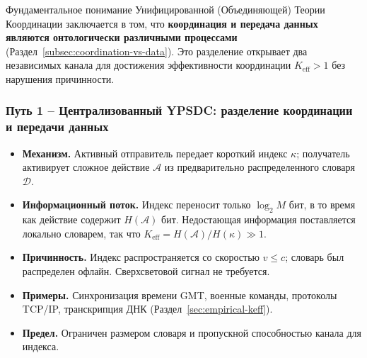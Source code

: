 \documentclass[11pt,a4paper]{article}
\begin{document}
	Фундаментальное понимание Унифицированной (Объединяющей) Теории Координации заключается в том, что
	\textbf{координация и передача данных являются онтологически различными процессами}
	(Раздел~\ref{subsec:coordination-vs-data}). Это разделение открывает два
	независимых канала для достижения эффективности координации
	\(K_{\mathrm{eff}} > 1\) без нарушения причинности.
	
	\subsubsection*{Путь 1 – Централизованный YPSDC: разделение координации и передачи данных}
	\begin{itemize}[leftmargin=*]
		\item \textbf{Механизм.} Активный отправитель передает короткий индекс \(\kappa\);
		получатель активирует сложное действие \(\mathcal{A}\) из предварительно распределенного
		словаря \(\mathcal{D}\).
		\item \textbf{Информационный поток.} Индекс переносит только \(\log_2 M\) бит,
		в то время как действие содержит \(H(\mathcal{A})\) бит. Недостающая информация
		поставляется локально словарем, так что
		\(K_{\mathrm{eff}} = H(\mathcal{A}) / H(\kappa) \gg 1\).
		\item \textbf{Причинность.} Индекс распространяется со скоростью \(v \le c\); словарь
		был распределен офлайн. Сверхсветовой сигнал не требуется.
		\item \textbf{Примеры.} Синхронизация времени GMT, военные команды,
		протоколы TCP/IP, транскрипция ДНК (Раздел~\ref{sec:empirical-keff}).
		\item \textbf{Предел.} Ограничен размером словаря и
		пропускной способностью канала для индекса.
	\end{itemize}
	
\end{document}
